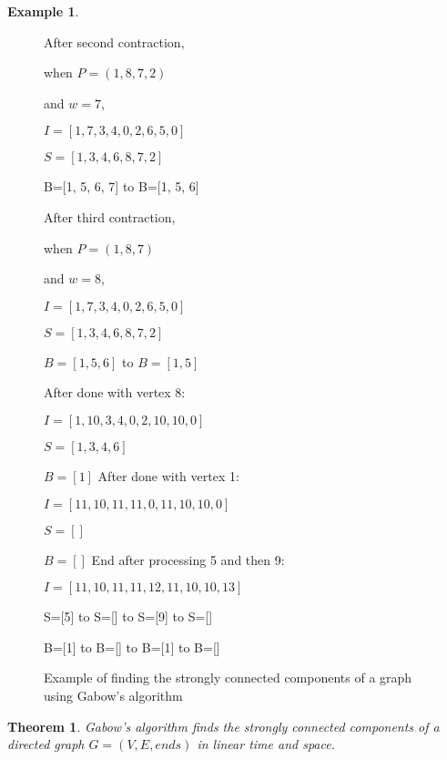 \documentclass{report}
\theoremstyle{plain}
\newtheorem{theorem}{Theorem}
\theoremstyle{definition}
\newtheorem{example}{Example}
\theoremstyle{remark}
\numberwithin{definition}{chapter}
\numberwithin{example}{chapter}
\numberwithin{figure}{chapter}
\numberwithin{theorem}{chapter}
\numberwithin{lemma}{chapter}
\begin{document}
\begin{example}
\begin{figure}[h]
After second contraction,

when $P=(1,8,7,2)$

and $w=7$,

$I=[1, 7, 3, 4, 0, 2, 6, 5, 0]$

$S=[1, 3, 4, 6, 8, 7, 2]$

B=[1, 5, 6, 7] to B=[1, 5, 6]
\endminipage\hfill
{}

After third contraction,

when $P=(1,8,7)$

and $w=8$,

$I=[1, 7, 3, 4, 0, 2, 6, 5, 0]$

$S=[1, 3, 4, 6, 8, 7, 2]$

$B=[1, 5, 6]$ to $B=[1, 5]$
\endminipage\hfill

\vspace*{2\baselineskip}

After done with vertex 8:

$I=[1, 10, 3, 4, 0, 2, 10, 10, 0]$

$S=[1, 3, 4, 6]$

$B=[1]$
\endminipage\hfill
{}
After done with vertex 1:

$I=[11, 10, 11, 11, 0, 11, 10, 10, 0]$

$S=[]$

$B=[]$
\endminipage\hfill
{}
End after processing 5 and then 9:

$I=[11, 10, 11, 11, 12, 11, 10, 10, 13]$

S=[5] to S=[] to S=[9] to S=[]

B=[1] to B=[] to B=[1] to B=[]
\endminipage\hfill


\caption{Example of finding the strongly connected components of a graph using Gabow's algorithm}
\end{figure}
\end{example}

\begin{theorem}
Gabow's algorithm finds the strongly connected components of a directed graph $G=(V,E,ends)$ in linear time and space.
\end{theorem}
\end{document}
